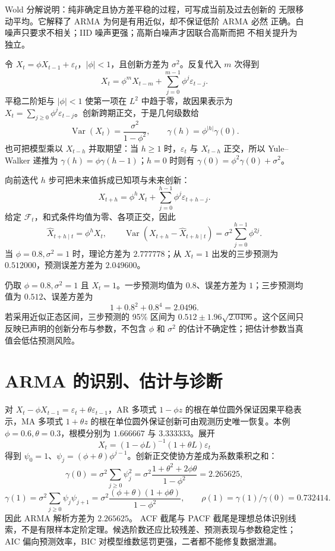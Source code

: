 Wold 分解说明：纯非确定且协方差平稳的过程，可写成当前及过去创新的
无限移动平均。它解释了 ARMA 为何是有用近似，却不保证低阶 ARMA 必然
正确。白噪声只要求不相关；IID 噪声更强；高斯白噪声才因联合高斯而把
不相关提升为独立。


令 $X_t=\phi X_{t-1}+\varepsilon_t$，$|\phi|<1$，且创新方差为 $\sigma^2$。反复代入 $m$ 次得到
\[
X_t=\phi^mX_{t-m}+\sum_{j=0}^{m-1}\phi^j\varepsilon_{t-j}.
\]
平稳二阶矩与 $|\phi|<1$ 使第一项在 $L^2$ 中趋于零，故因果表示为 $X_t=\sum_{j\ge0}\phi^j\varepsilon_{t-j}$。创新跨期正交，于是几何级数给
\[
  \operatorname{Var}(X_t)=\frac{\sigma^2}{1-\phi^2},\qquad
  \gamma(h)=\phi^{|h|}\gamma(0).
\]
也可把模型乘以 $X_{t-h}$ 并取期望：当 $h\ge1$ 时，$\varepsilon_t$ 与 $X_{t-h}$ 正交，所以 Yule--Walker 递推为 $\gamma(h)=\phi\gamma(h-1)$；$h=0$ 时则有 $\gamma(0)=\phi^2\gamma(0)+\sigma^2$。

向前迭代 $h$ 步可把未来值拆成已知项与未来创新：
\[
X_{t+h}=\phi^hX_t+\sum_{j=0}^{h-1}\phi^j\varepsilon_{t+h-j}.
\]
给定 $\mathcal F_t$，和式条件均值为零、各项正交，因此
\[
  \widehat X_{t+h\mid t}=\phi^hX_t,
  \qquad
  \operatorname{Var}(X_{t+h}-\widehat X_{t+h\mid t})
  =\sigma^2\sum_{j=0}^{h-1}\phi^{2j}.
\]
当 $\phi=0.8,\sigma^2=1$ 时，理论方差为 $2.777778$；从 $X_t=1$ 出发的三步预测为 $0.512000$，预测误差方差为 $2.049600$。

\begin{example}[从预测误差到区间]
仍取 $\phi=0.8,\sigma^2=1$ 且 $X_t=1$。一步预测均值为 $0.8$、误差方差为 $1$；三步预测均值为 $0.512$、误差方差为
\[
  1+0.8^2+0.8^4=2.0496.
\]
若采用近似正态区间，三步预测的 95\% 区间为
$0.512\pm1.96\sqrt{2.0496}$。这个区间只反映已声明的创新分布与参数，不包含 $\phi$ 和 $\sigma^2$ 的估计不确定性；把估计参数当真值会低估预测风险。
\end{example}

\section{ARMA 的识别、估计与诊断}

对 $X_t-\phi X_{t-1}=\varepsilon_t+\theta\varepsilon_{t-1}$，AR 多项式 $1-\phi z$ 的根在单位圆外保证因果平稳表示，MA 多项式 $1+\theta z$ 的根在单位圆外保证创新可由观测历史唯一恢复。本例 $\phi=0.6,\theta=0.3$，根模分别为 $1.666667$ 与 $3.333333$。展开
\[
X_t=(1-\phi L)^{-1}(1+\theta L)\varepsilon_t
\]
得到 $\psi_0=1$、$\psi_j=(\phi+\theta)\phi^{j-1}$。创新正交使协方差成为系数乘积之和：
\[
\gamma(0)=\sigma^2\sum_{j\ge0}\psi_j^2
=\sigma^2\frac{1+\theta^2+2\phi\theta}{1-\phi^2}=2.265625,
\]
\[
\gamma(1)=\sigma^2\sum_{j\ge0}\psi_j\psi_{j+1}
=\sigma^2\frac{(\phi+\theta)(1+\phi\theta)}{1-\phi^2},
\qquad \rho(1)=\gamma(1)/\gamma(0)=0.732414.
\]
因此 ARMA 解析方差为 $2.265625$。
ACF 截尾与 PACF 截尾是理想总体识别线索，不是有限样本定阶定理。候选阶数还应比较残差、预测表现与参数稳定性；AIC 偏向预测效率，BIC 对模型维数惩罚更强，二者都不能修复数据泄漏。

